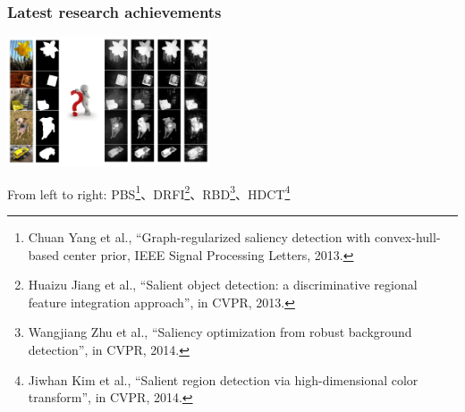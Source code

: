 \documentclass[notheorems,serif,table,compress]{beamer}  %
\begin{document}
\begin{frame}
\frametitle{Latest research achievements}
\centering\includegraphics[width=6cm]{latest}

  From left to right: PBS\footnote{Chuan Yang et al., ``Graph-regularized saliency detection with convex-hull-based center prior, IEEE Signal Processing Letters, 2013.}、DRFI\footnote{Huaizu Jiang et al., ``Salient object detection: a discriminative regional feature integration approach'', in CVPR, 2013.}、RBD\footnote{Wangjiang Zhu et al., ``Saliency optimization from robust background detection'', in CVPR, 2014.}、HDCT\footnote{Jiwhan Kim et al., ``Salient region detection via high-dimensional color transform'', in CVPR, 2014.}
\end{frame}
\end{document}
